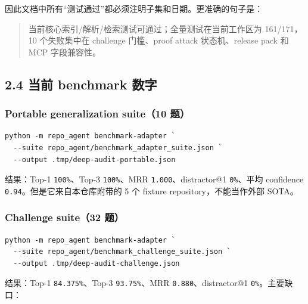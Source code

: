 \documentclass[UTF8,12pt,openany]{ctexbook}
\begin{document}
因此文档中所有“测试通过”都必须注明子集和日期。更准确的句子是：\par

\begin{quote}
当前核心索引/解析/检索测试可通过；全量测试在当前工作区为 161/171，10 个失败集中在 challenge 门槛、proof attack 状态机、release pack 和 MCP 字段兼容性。
\end{quote}

\subsection{2.4 当前 benchmark 数字}

\subsubsection{Portable generalization suite（10 题）}

\begin{lstlisting}
python -m repo_agent benchmark-adapter `
  --suite repo_agent/benchmark_adapter_suite.json `
  --output .tmp/deep-audit-portable.json
\end{lstlisting}

结果：Top-1 \texttt{100\%}、Top-3 \texttt{100\%}、MRR \texttt{1.000}、distractor@1 \texttt{0\%}、平均 confidence \texttt{0.94}。但是它来自本仓库附带的 5 个 fixture repository，不能当作外部 SOTA。\par

\subsubsection{Challenge suite（32 题）}

\begin{lstlisting}
python -m repo_agent benchmark-adapter `
  --suite repo_agent/benchmark_challenge_suite.json `
  --output .tmp/deep-audit-challenge.json
\end{lstlisting}

结果：Top-1 \texttt{84.375\%}、Top-3 \texttt{93.75\%}、MRR \texttt{0.880}、distractor@1 \texttt{0\%}。主要缺口：\par
\end{document}

